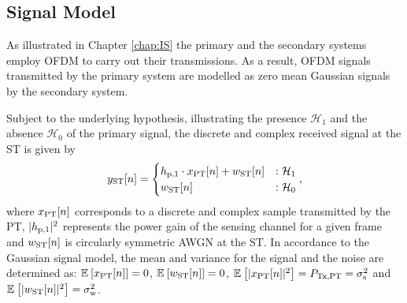 

\subsection{Signal Model}
As illustrated in Chapter \ref{chap:IS} the primary and the secondary systems employ OFDM to carry out their transmissions. As a result, OFDM signals transmitted by the primary system are modelled as zero mean Gaussian signals by the secondary system. 

Subject to the underlying hypothesis, illustrating the presence $\mathcal H_1$ and the absence $\mathcal H_0$ of the primary signal, the discrete and complex received signal at the ST is given by 
\begin{equation}
y_{\text{ST}}[n] = 
\begin{cases}
h_{\text{p,1}} \cdot x_{\text{PT}}[n] + w_{\text{ST}}[n] & : \mathcal{H}_1 \\
w_{\text{ST}}[n] & :\mathcal{H}_0
\end{cases},
\label{eq_HS:sig_mod_st}
\end{equation}
where $x_{\text{PT}}[n]$ corresponds to a discrete and complex sample transmitted by the PT, $|h_{\text{p,1}}|^2$ represents the power gain of the sensing channel for a given frame and $w_{\text{ST}}[n]$ is circularly symmetric AWGN at the ST. 
In accordance to the Gaussian signal model, the mean and variance for the signal and the noise are determined as: ${\mathbb E}_{}\left[ x_{\text{PT}}[n] \right] = 0$, ${\mathbb E}_{}\left[ w_{\text{ST}}[n] \right] = 0$, ${\mathbb E}_{}\left[ |x_{\text{PT}}[n]|^2 \right] = P_{\text{Tx,PT}} = \sigma^2_{\text{s}}$ and ${\mathbb E}_{}\left[ |w_{\text{ST}}[n]|^2 \right] = \sigma^2_{\text{w}}$. 

